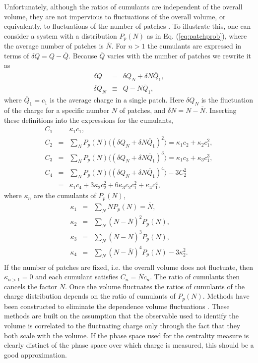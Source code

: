 Unfortunately, although the ratios of cumulants are independent of the overall volume, they are not impervious to fluctuations of the overall volume, or equivalently, to fluctuations of the number of patches \cite{volumefluc}. To illustrate this, one can consider a system with a distribution $P_p(N)$  as in Eq. (\ref{eq:patchprob}), where the average number of patches is $\overline{N}$. For $n>1$ the cumulants are expressed in terms of $\delta Q=Q-\overline{Q}$. Because $\overline{Q}$ varies with the number of patches we rewrite it as
\begin{eqnarray}
\delta Q&=&\delta Q_N+\delta N\overline{Q}_1,\\
\delta Q_N&\equiv&Q-N\overline{Q}_1,
\end{eqnarray}
where $\overline{Q}_1=c_1$ is the average charge in a single patch. Here $\delta Q_N$ is the fluctuation of the charge for a specific number $N$ of patches, and $\delta N=N-\overline{N}$. Inserting these definitions into the expressions for the cumulants,
\begin{eqnarray}\label{eq:volfluc}
C_1&=&\kappa_1c_1,\\
\nonumber
C_2&=&\sum_NP_p(N) \langle(\delta Q_N+\delta N\overline{Q}_1)^2\rangle=\kappa_1c_2+\kappa_2c_1^2,\\
\nonumber
C_3&=&\sum_NP_p(N) \langle(\delta Q_N+\delta N\overline{Q}_1)^3\rangle=\kappa_1c_3+\kappa_3c_1^3,\\
\nonumber
C_4&=&\sum_NP_p(N) \langle(\delta Q_N+\delta N\overline{Q}_1)^4\rangle-3C_2^2\\
\nonumber
&=&\kappa_1c_4+3\kappa_2c_2^2+6\kappa_3c_2c_1^2+\kappa_4c_1^4,
\end{eqnarray}
where $\kappa_n$ are the cumulants of $P_p(N)$,
\begin{eqnarray}\label{eq:kappadef}
\kappa_1&=&\sum_N NP_p(N)=\overline{N},\\
\nonumber
\kappa_2&=&\sum_N (N-\overline{N})^2P_p(N),\\
\nonumber
\kappa_3&=&\sum_N (N-\overline{N})^3P_p(N),\\
\nonumber
\kappa_4&=&\sum_N (N-\overline{N})^4P_p(N)-3\kappa_2^2.\\
\end{eqnarray}
If the number of patches are fixed, i.e. the overall volume does not fluctuate, then $\kappa_{n>1}=0$ and each cumulant satisfies $C_n=\overline{N} c_n$. The ratio of cumulants then cancels the factor $\overline{N}$. 
Once the volume fluctuates the ratios of cumulants of the charge distribution depends on the ratio of cumulants of $P_p(N)$. Methods have been constructed to eliminate the dependence volume fluctuations \cite{Begun:2014boa,Gazdzicki:2013ana,Gorenstein:2011vq,Sangaline:2015bma}. These methods are built on the assumption that the observable used to identify the volume is correlated to the fluctuating charge only through the fact that they both scale with the volume. If the phase space used for the centrality measure is clearly distinct of the phase space over which charge is measured, this should be a good approximation. 

